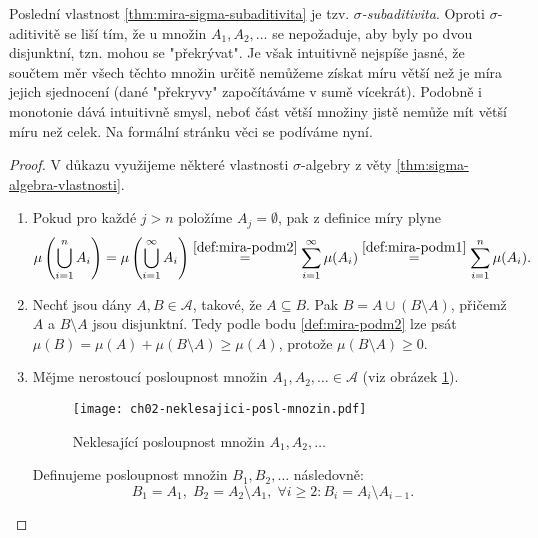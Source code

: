 Poslední vlastnost \ref{thm:mira-sigma-subaditivita} je tzv. \emph{$\sigma$-subaditivita}. Oproti $\sigma$-aditivitě se liší tím, že u množin $A_1,A_2,\dots$ se nepožaduje, aby byly po dvou disjunktní, tzn. mohou se "překrývat". Je však intuitivně nejspíše jasné, že součtem měr všech těchto množin určitě nemůžeme získat míru větší než je míra jejich sjednocení (dané "překryvy" započítáváme v sumě vícekrát). Podobně i monotonie dává intuitivně smysl, neboť část větší množiny jistě nemůže mít větší míru než celek. Na formální stránku věci se podíváme nyní.
\begin{proof}
    V důkazu využijeme některé vlastnosti $\sigma$-algebry z věty \ref{thm:sigma-algebra-vlastnosti}.
    \begin{enumerate}[label=\textit{(\roman*)}]
        \item Pokud pro každé $j>n$ položíme $A_j=\emptyset$, pak z definice míry plyne
        \[\mu\left(\bigcup_{i=1}^n A_i\right)=\mu\left(\bigcup_{i=1}^\infty A_i\right)\stackrel{\ref{def:mira-podm2}}{=}\sum_{i=1}^{\infty}\mu(A_i)\stackrel{\ref{def:mira-podm1}}{=}\sum_{i=1}^{n}\mu(A_i).\]
        \item Nechť jsou dány $A,B\in\mathcal{A}$, takové, že $A\subseteq B$. Pak $B=A\cup(B\setminus A)$, přičemž $A$ a $B\setminus A$ jsou disjunktní. Tedy podle bodu \ref{def:mira-podm2} lze psát $\mu(B)=\mu(A)+\mu(B\setminus A)\geqslant\mu(A)$, protože $\mu(B\setminus A)\geqslant 0$.
        \item Mějme nerostoucí posloupnost množin $A_1,A_2,\ldots\in\mathcal{A}$ (viz obrázek \ref{fig:nekl-posl-mnozin}).
        \begin{figure}[h]
            \centering
            \texttt{[image: ch02-neklesajici-posl-mnozin.pdf]}
            \caption{Neklesající posloupnost množin $A_1,A_2,\ldots$}
            \label{fig:nekl-posl-mnozin}
        \end{figure}
        Definujeme posloupnost množin $B_1,B_2,\ldots$ následovně:
        \[B_1=A_1,\;B_2=A_2\setminus A_1,\;\forall i\geqslant 2: B_i=A_i\setminus A_{i-1}.\]
    \end{enumerate}
\end{proof}